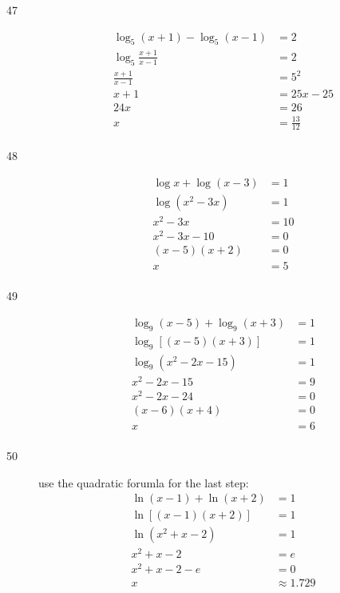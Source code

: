 \documentclass{exam}
\begin{document}
\begin{description}
      \item[47] 
        \begin{align*}
          \log_5 (x + 1) - \log_5 (x - 1) &= 2 \\
          \log_5 \frac{x + 1}{x - 1}      &= 2 \\
          \frac{x + 1}{x - 1}             &= 5^2 \\
          x + 1                           &= 25x - 25 \\
          24x                             &= 26 \\
          x                               &= \boxed{\frac{13}{12}} \\
        \end{align*}

      \item[48] 
        \begin{align*}
          \log x + \log (x - 3)        &= 1 \\
          \log \left( x^2 - 3x \right) &= 1 \\
          x^2 - 3x                     &= 10 \\
          x^2 - 3x - 10                &= 0 \\
          (x - 5)(x + 2)               &= 0 \\
          x                            &= \boxed{5} \\
        \end{align*}

      \item[49] 
        \begin{align*}
          \log_9(x - 5) + \log_9(x + 3)      &= 1 \\
          \log_9[ (x - 5)(x + 3) ]           &= 1 \\
          \log_9\left( x^2 - 2x - 15 \right) &= 1 \\
          x^2 - 2x - 15                      &= 9 \\
          x^2 - 2x - 24                      &= 0 \\
          (x - 6)(x + 4)                     &= 0 \\
          x                                  &= \boxed{6} \\
        \end{align*}

      \item[50] 
        use the quadratic forumla for the last step:
        \begin{align*}
          \ln(x - 1) + \ln(x + 2)        & = 1 \\
          \ln [(x - 1)(x + 2)]           & = 1 \\
          \ln \left( x^2 + x - 2 \right) & = 1 \\
           x^2 + x - 2                   & = e \\
           x^2 + x - 2 - e               & = 0 \\
           x                             & \approx \boxed{1.729} \\
        \end{align*}


\end{description}
\end{document}
